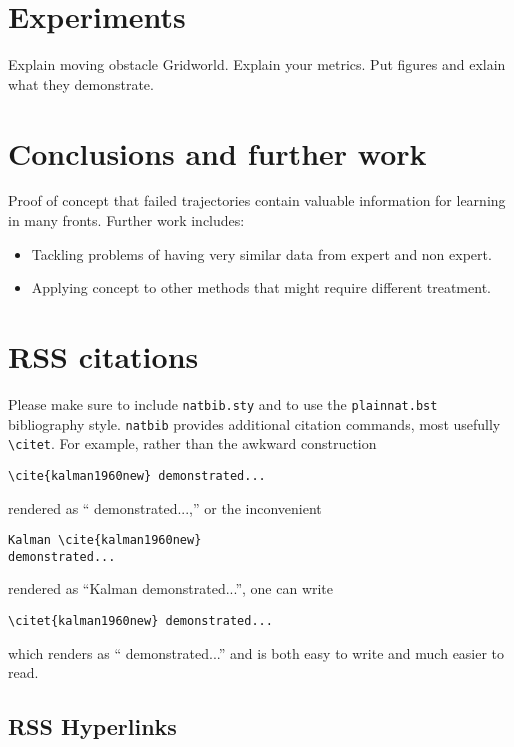\documentclass[conference]{IEEEtran}
\begin{document}
\section{Experiments}
Explain moving obstacle Gridworld. Explain your metrics. Put figures and exlain what they demonstrate.

\section{Conclusions and further work}
Proof of concept that failed trajectories contain valuable information for learning in many fronts. 
Further work includes:
\begin{itemize}
	\item Tackling problems of having very similar data from expert and non expert.
	\item Applying concept to other methods that might require different treatment.
\end{itemize}


\section{RSS citations}

Please make sure to include \verb!natbib.sty! and to use the
\verb!plainnat.bst! bibliography style. \verb!natbib! provides additional
citation commands, most usefully \verb!\citet!. For example, rather than the
awkward construction 

{\small
\begin{verbatim}
\cite{kalman1960new} demonstrated...
\end{verbatim}
}

\noindent
rendered as ``\cite{kalman1960new} demonstrated...,''
or the
inconvenient 

{\small
\begin{verbatim}
Kalman \cite{kalman1960new} 
demonstrated...
\end{verbatim}
}

\noindent
rendered as 
``Kalman \cite{kalman1960new} demonstrated...'', 
one can
write 

{\small
\begin{verbatim}
\citet{kalman1960new} demonstrated... 
\end{verbatim}
}
\noindent
which renders as ``\citet{kalman1960new} demonstrated...'' and is 
both easy to write and much easier to read.
  
\subsection{RSS Hyperlinks}
\end{document}
